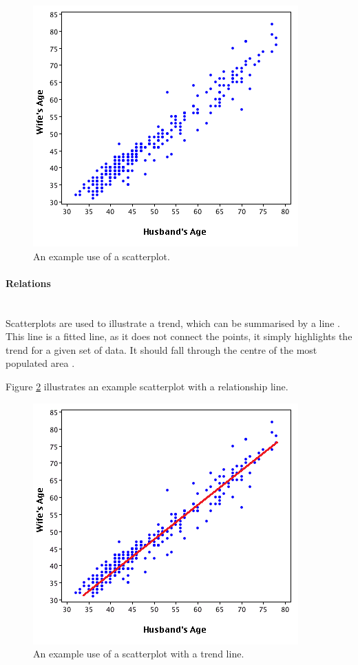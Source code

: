 \begin{figure}[H]
  \centering
    \includegraphics[scale=1]{chapter3/visualisation/scatterplot.png}
  \caption{An example use of a scatterplot.}
  \label{fig:scatterplot_line}
\end{figure}


\paragraph{Relations} ~\\
Scatterplots are used to illustrate a trend, which can be summarised by a line
\citep{kosslyn06}. This line is a fitted line, as it does not connect the 
points, it simply highlights the trend for a given set of data. It should fall
through the centre of the most populated area \citep{kosslyn06}.

Figure \ref{fig:scatterplot_line} illustrates an example scatterplot with a 
relationship line.

\begin{figure}[H]
  \centering
    \includegraphics[scale=1]{chapter3/visualisation/scatterplot_line.png}
  \caption{An example use of a scatterplot with a trend line.}
  \label{fig:scatterplot_line}
\end{figure}


